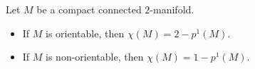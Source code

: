 Let $M$ be a compact connected $2$-manifold.
\begin{itemize}
\item If $M$ is orientable, then $\chi(M) = 2 - p^1(M)$.
\item If $M$ is non-orientable, then $\chi(M) = 1 - p^1(M)$.
\end{itemize}
